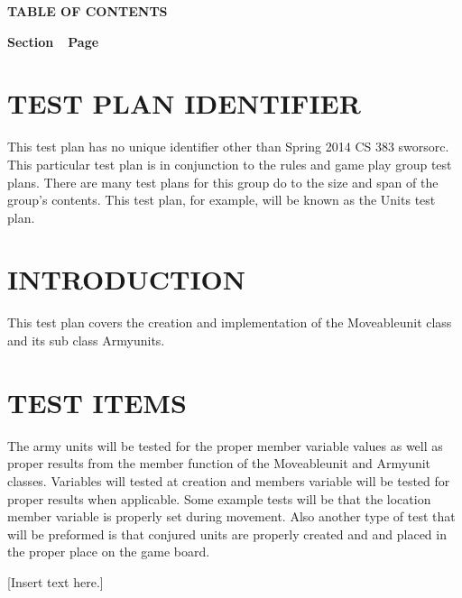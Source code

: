 {\centering{}\bfseries\color{black}
TABLE OF CONTENTS
\par}

{\bfseries\color{black}
Section\ \ Page}

\setcounter{tocdepth}{9}
\renewcommand\contentsname{}
\tableofcontents

\setcounter{page}{1}\pagestyle{Convertiv}

\section[IDENTIFIER]{\bfseries\color{black} TEST PLAN IDENTIFIER}

{\color{black}
This test plan has no unique identifier other than Spring 2014 CS 383 sworsorc. This particular test plan is in conjunction to the rules and game play group test plans. There are many test plans for this group do to the size and span of the group's contents. This test plan, for example, will be known as the Units test plan.}


\section[INTRODUCTION]{\bfseries\color{black} INTRODUCTION}

{\itshape\color{black}

This test plan covers the creation and implementation of the Moveableunit class and its sub class Armyunits. 
}

\section[TEST ITEMS]{\bfseries\color{black} TEST ITEMS}

{\itshape\color{black}

The army units will be tested for the proper member variable values as well as proper results from the member function of the Moveableunit and Armyunit classes. Variables will tested at creation and members variable will be tested for proper results when applicable. Some example tests will be that the location member variable is properly set during movement. Also another type of test that will be preformed is that conjured units are properly created and and placed in the proper place on the game board. 
}

{\color{black}
[Insert text here.]}

